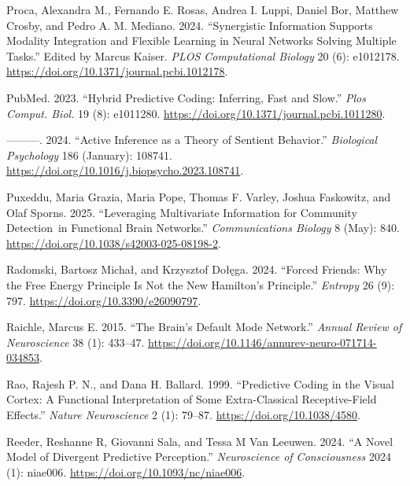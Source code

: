 \documentclass[
  a4paper]{article}
\newlength{\cslhangindent}
\newenvironment{CSLReferences}[2] %
 {\begin{list}{}{%
  \setlength{\itemindent}{0pt}
  \setlength{\leftmargin}{0pt}
  \setlength{\parsep}{0pt}
  \ifodd #1
   \setlength{\leftmargin}{\cslhangindent}
   \setlength{\itemindent}{-1\cslhangindent}
  \fi
  \setlength{\itemsep}{#2\baselineskip}}}
 {\end{list}}
\begin{document}
\begin{CSLReferences}{1}{0}
Proca, Alexandra M., Fernando E. Rosas, Andrea I. Luppi, Daniel Bor,
Matthew Crosby, and Pedro A. M. Mediano. 2024. {``Synergistic
Information Supports Modality Integration and Flexible Learning in
Neural Networks Solving Multiple Tasks.''} Edited by Marcus Kaiser.
\emph{PLOS Computational Biology} 20 (6): e1012178.
\url{https://doi.org/10.1371/journal.pcbi.1012178}.

PubMed. 2023. {``Hybrid Predictive Coding: Inferring, Fast and Slow.''}
\emph{Plos Comput. Biol.} 19 (8): e1011280.
\url{https://doi.org/10.1371/journal.pcbi.1011280}.

---------. 2024. {``Active Inference as a Theory of Sentient
Behavior.''} \emph{Biological Psychology} 186 (January): 108741.
\url{https://doi.org/10.1016/j.biopsycho.2023.108741}.

Puxeddu, Maria Grazia, Maria Pope, Thomas F. Varley, Joshua Faskowitz,
and Olaf Sporns. 2025. {``Leveraging Multivariate Information for
Community Detection~in Functional Brain Networks.''}
\emph{Communications Biology} 8 (May): 840.
\url{https://doi.org/10.1038/s42003-025-08198-2}.

Radomski, Bartosz Michał, and Krzysztof Dołęga. 2024. {``Forced Friends:
Why the Free Energy Principle Is Not the New Hamilton's Principle.''}
\emph{Entropy} 26 (9): 797. \url{https://doi.org/10.3390/e26090797}.

Raichle, Marcus E. 2015. {``The Brain's Default Mode Network.''}
\emph{Annual Review of Neuroscience} 38 (1): 433--47.
\url{https://doi.org/10.1146/annurev-neuro-071714-034853}.

Rao, Rajesh P. N., and Dana H. Ballard. 1999. {``Predictive Coding in
the Visual Cortex: A Functional Interpretation of Some Extra-Classical
Receptive-Field Effects.''} \emph{Nature Neuroscience} 2 (1): 79--87.
\url{https://doi.org/10.1038/4580}.

Reeder, Reshanne R, Giovanni Sala, and Tessa M Van Leeuwen. 2024. {``A
Novel Model of Divergent Predictive Perception.''} \emph{Neuroscience of
Consciousness} 2024 (1): niae006.
\url{https://doi.org/10.1093/nc/niae006}.


\end{CSLReferences}
\end{document}
